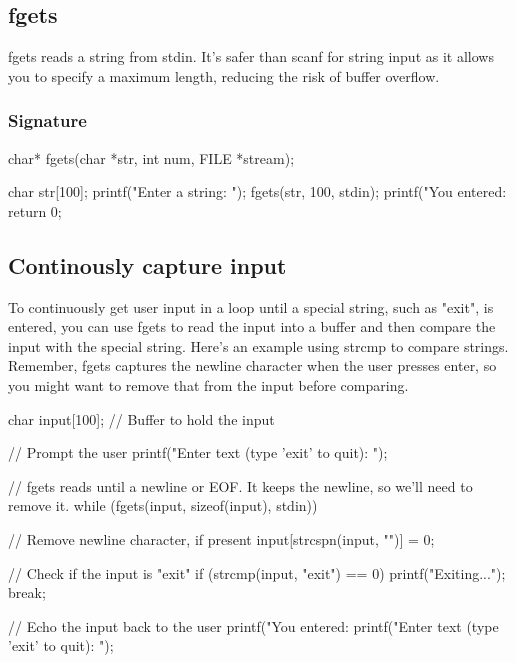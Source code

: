 \documentclass{report}
\begin{document}
        \bigbreak \noindent 
        \subsection{fgets}
        \bigbreak \noindent 
        fgets reads a string from stdin. It's safer than scanf for string input as it allows you to specify a maximum length, reducing the risk of buffer overflow.
        \bigbreak \noindent 
        \subsubsection{Signature}
        \bigbreak \noindent 
        \begin{cppcode}
        char* fgets(char *str, int num, FILE *stream);
        \end{cppcode}
        \bigbreak \noindent 
        \begin{cppcode}
            char str[100];
            printf("Enter a string: ");
            fgets(str, 100, stdin);
            printf("You entered: %
            return 0;
        \end{cppcode}
        \bigbreak \noindent 

        \bigbreak \noindent 
        \subsection{Continously capture input}
        \bigbreak \noindent 
        To continuously get user input in a loop until a special string, such as "exit", is entered, you can use fgets to read the input into a buffer and then compare the input with the special string. Here’s an example using strcmp to compare strings. Remember, fgets captures the newline character when the user presses enter, so you might want to remove that from the input before comparing.
        \bigbreak \noindent 
        \begin{cppcode}
    char input[100]; // Buffer to hold the input

    // Prompt the user
    printf("Enter text (type 'exit' to quit): ");

    // fgets reads until a newline or EOF. It keeps the newline, so we'll need to remove it.
    while (fgets(input, sizeof(input), stdin)) {
        // Remove newline character, if present
        input[strcspn(input, "\n")] = 0;

        // Check if the input is "exit"
        if (strcmp(input, "exit") == 0) {
            printf("Exiting...\n");
            break;
        }

        // Echo the input back to the user
        printf("You entered: %
        printf("Enter text (type 'exit' to quit): ");
    }
        \end{cppcode}




        



        

    




    
    

    
\end{document}
